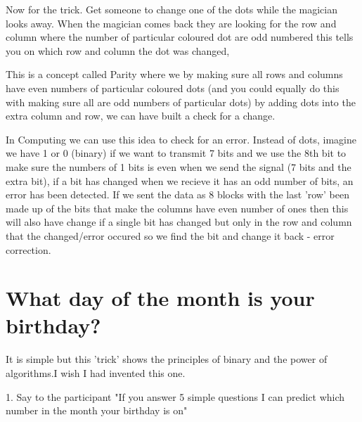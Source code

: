 Now for the trick. Get someone to change one of the dots while the magician looks away. When the magician comes back they are looking for the row and column where the number of particular coloured dot are odd numbered this tells you on which row and column the dot was changed,

This is a concept called Parity where we by making sure all rows and columns have even numbers of particular coloured dots (and you could equally do this with making sure all are odd numbers of particular dots) by adding dots into the extra column and row, we can have built a check for a change.

In Computing we can use this idea to check for an error. Instead of dots, imagine we have 1 or 0 (binary) if we want to transmit 7 bits and we use the 8th bit to make sure the numbers of 1 bits is even when we send the signal (7 bits and the extra bit), if a bit has changed when we recieve it has an odd number of bits, an error has been detected. If we sent the data as 8 blocks with the last 'row' been made up of the bits that make the columns have even number of ones then this will also have change if a single bit has changed but only in the row and column that the changed/error occured so we find the bit and change it back - error correction.

\section{What day of the month is your birthday?}
It is simple but this 'trick' shows the principles of binary and the power of algorithms.I wish I had invented this one.

1.	Say to the participant "If you answer 5 simple questions I can predict which number in the month your birthday is on"

